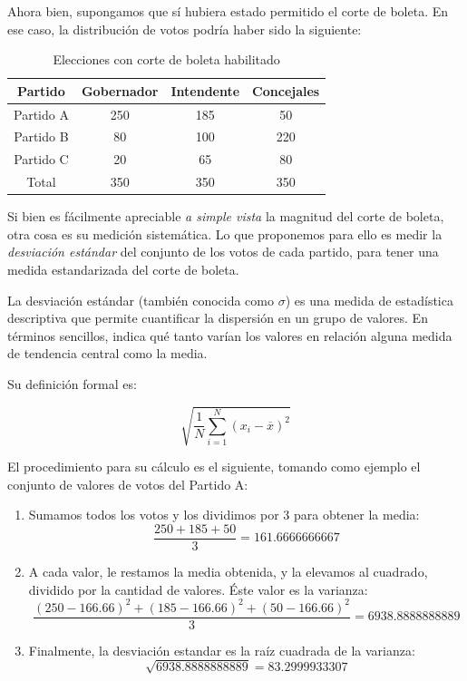 \documentclass[12pt,a4paper]{article}
\begin{document}
Ahora bien, supongamos que sí hubiera estado permitido el corte de boleta. En
ese caso, la distribución de votos podría haber sido la siguiente:

\renewcommand{\arraystretch}{1.25}
\begin{table}[h!]
\centering
\begin{tabular}{c c c c} 
 Partido & Gobernador & Intendente & Concejales \\ [0.5ex] 
 \hline
Partido A & 250 & 185 & 50 \\
Partido B & 80 & 100 & 220 \\
Partido C & 20 & 65 & 80 \\
 \hline
Total & 350 & 350 & 350 \\ [1ex]
 \hline
\end{tabular}
\caption{Elecciones con corte de boleta habilitado}
\label{table:1}
\end{table}

Si bien es fácilmente apreciable \emph{a simple vista} la magnitud del corte de boleta, otra cosa es
su medición sistemática. Lo que proponemos para ello es medir la
\emph{desviación estándar} del conjunto de los votos de cada partido, para tener una medida
estandarizada del corte de boleta.

La desviación estándar (también conocida como \(\sigma\)) es una medida de
estadística descriptiva que permite 
cuantificar la dispersión en un grupo de valores. En términos sencillos, indica
qué tanto varían los valores en relación alguna medida de tendencia central como
la media.

Su definición formal es:

\[ \sqrt{\frac{1}{N} \sum_{i=1}^N (x_i - \overline{x})^2} \]

El procedimiento para su cálculo es el siguiente, tomando como ejemplo el
conjunto de valores de votos del Partido A:

\begin{enumerate}
  \item Sumamos todos los votos y los dividimos por 3 para obtener la media:
\[ \frac{250 + 185 + 50}{3} = 161.6666666667\]
  \item A cada valor, le restamos la media obtenida, y  la elevamos al cuadrado,
    dividido por la cantidad de valores. Éste valor es la varianza:
\[\frac{(250 - 166.66)^2 + (185 - 166.66)^2 + (50-166.66)^2}{3} = 6938.8888888889\]
  \item Finalmente, la desviación estandar es la raíz cuadrada de la varianza:
\[\sqrt{6938.8888888889} = 83.2999933307\]
\end{enumerate}
\end{document}
